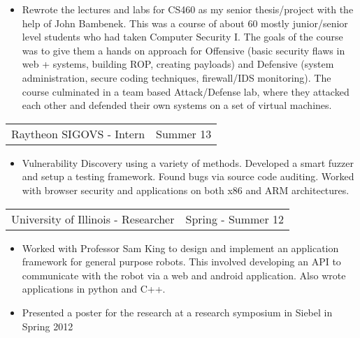 \documentclass[margin]{res}
\begin{document}
\begin{resume}
\begin{itemize}
                     \item Rewrote the lectures and labs for CS460 as my senior thesis/project with the
                     help of John Bambenek.  This was a course of about 60 mostly junior/senior level 
                     students who had taken Computer Security I.  The goals of the course was to give them 
                     a hands on approach for Offensive (basic security flaws in web + systems, building ROP,
                     creating payloads) and Defensive (system administration, secure coding techniques, firewall/IDS
                     monitoring).  The course culminated in a team based Attack/Defense lab, where they attacked each
                     other and defended their own systems on a set of virtual machines.
		   \end{itemize}
\begin{tabular}{p{3in} r} %
                  Raytheon SIGOVS - Intern &  Summer 13
                  \end{tabular}
\begin{itemize} \itemsep -2pt %
                    \item Vulnerability Discovery using a variety of
                      methods.  Developed a smart fuzzer and setup a
                      testing framework.  Found bugs via source code
                      auditing.  Worked with browser security
                      and applications on both x86 and ARM architectures.
		   \end{itemize}
		 \begin{tabular}{p{3in} r}
                  University of Illinois - Researcher &  Spring - Summer 12
                 \end{tabular}
		  \begin{itemize} \itemsep -2pt
                   \item Worked with Professor Sam King to design
                     and implement an application framework for
                     general purpose robots.  This involved developing
                     an API to communicate with the robot via a web
                     and android application.  Also wrote applications
                     in python and C++.
                   \item Presented a poster for
                     the research at a research symposium in Siebel in
                     Spring 2012
                  \end{itemize}


\end{resume}
\end{document}
